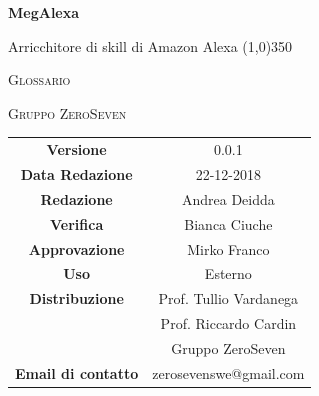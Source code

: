 \documentclass[a4paper,12pt]{article}
\author{Mirko Franco}
\date{14-12-2018}
\begin{document}
\begin{titlepage}
	\centering
	{\huge\bfseries MegAlexa\par}
	Arricchitore di skill di Amazon Alexa
	\line(1,0){350} \\
	{\scshape\LARGE Glossario \par}
	\vspace{1cm}
	{\scshape Gruppo ZeroSeven \par}
	\logo
		\begin{tabular}{c|c}
		{\hfill \textbf{Versione}} 			& 0.0.1				\\
		{\hfill\textbf{Data Redazione}} 	& 22-12-2018		\\ 
		{\hfill\textbf{Redazione}} 			& Andrea Deidda			\\ 
		{\hfill\textbf{Verifica}} 				&  	Bianca Ciuche				\\ 
		{\hfill\textbf{Approvazione}} 		&  		Mirko Franco			\\ 
		{\hfill\textbf{Uso}} 					& 		Esterno		\\ 
		{\hfill\textbf{Distribuzione}} 			& 			Prof. Tullio Vardanega \\ & Prof. Riccardo Cardin \\ & Gruppo ZeroSeven		\\ 
		{\hfill\textbf{Email di contatto}} & zerosevenswe@gmail.com \\
	\end{tabular}
\end{titlepage}

	\label{LastFrontPage}
	\newpage	
	
	\pagestyle{mymain}
	\tableofcontents
	
	

	
	\printindex
	\label{LastPage}
	
	
\end{document}
